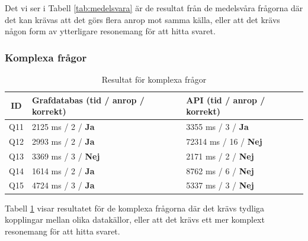 Det vi ser i Tabell \ref{tab:medelsvara} är de resultat från de medelsvåra frågorna där det kan krävas att det görs flera anrop mot samma källa, eller att det krävs någon form av ytterligare resonemang för att hitta svaret. 

\subsubsection{Komplexa frågor}\label{subsubsec:komplexaFragorResult}

\begin{table}[H]
\centering
\begin{tabular}{|c|l|l|}
\hline
\rowcolor{blue!25}
\textbf{ID} & \textbf{Grafdatabas (tid / anrop / korrekt)} & \textbf{API (tid / anrop / korrekt)} \\
\hline
Q11 & 2125 ms / 2 / \textcolor{green!60!black}{\textbf{Ja}} & 3355 ms / 3 / \textcolor{green!60!black}{\textbf{Ja}} \\
\rowcolor{gray!12}
Q12 & 2993 ms / 2 / \textcolor{green!60!black}{\textbf{Ja}} & 72314 ms / 16 / \textcolor{red!70!black}{\textbf{Nej}} \\
Q13 & 3369 ms / 3 / \textcolor{red!70!black}{\textbf{Nej}} & 2171 ms / 2 / \textcolor{red!70!black}{\textbf{Nej}} \\
\rowcolor{gray!12}
Q14 & 1614 ms / 2 / \textcolor{green!60!black}{\textbf{Ja}} & 8762 ms / 6 / \textcolor{red!70!black}{\textbf{Nej}} \\
Q15 & 4724 ms / 3 / \textcolor{green!60!black}{\textbf{Ja}} & 5337 ms / 3 / \textcolor{red!70!black}{\textbf{Nej}} \\
\hline
\end{tabular}
\caption{Resultat för komplexa frågor}
\label{tab:komplexa}
\end{table}

Tabell \ref{tab:komplexa} visar resultatet för de komplexa frågorna där det krävs tydliga kopplingar mellan olika datakällor, eller att det krävs ett mer komplext resonemang för att hitta svaret.

